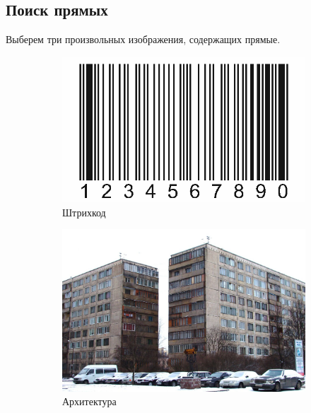 \documentclass[a4paper, 16pt]{article}
\begin{document}
    \subsection{Поиск прямых}
    \noindent Выберем три произвольных изображения, содержащих прямые.
    \begin{figure}[htbp]
        \centering
        \begin{subfigure}{0.3\textwidth}
            \centering
            \includegraphics[width=\linewidth]{i1.png}
            \caption{Штрихкод}
            \label{fig:i1}
        \end{subfigure}
        \hfill
        \begin{subfigure}{0.3\textwidth}
            \centering
            \includegraphics[width=\linewidth]{i2.png}
            \caption{Архитектура}
            \label{fig:i2}
        \end{subfigure}
        \hfill
        \begin{subfigure}{0.3\textwidth}

\end{subfigure}
\end{figure}
\end{document}
